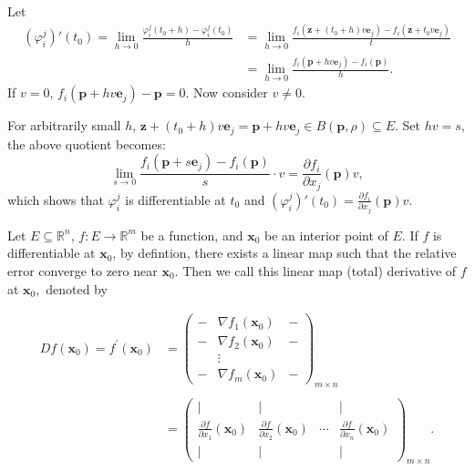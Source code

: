 \documentclass[12pt]{article}
\begin{document}
\begin{dbox}
\begin{pf}
Let 
\begin{align*}
(\varphi_i^j)'(t_0) = \lim_{h\to 0}\frac{\varphi_i^j(t_0+h)-\varphi_i^j(t_0)}{h}
&=\lim_{h\to 0}\frac{f_i(\mathbf{z} + (t_0+h) v \mathbf{e}_j)-f_i(\mathbf{z} + t_0 v \mathbf{e}_j)}{t}\\
&=\lim_{h\to 0}\frac{f_i(\mathbf{p}+hv\mathbf{e}_j)-f_i(\mathbf{p})}{h}.
\end{align*}
If $v=0$, $f_i(\mathbf{p}+hv\mathbf{e}_j)-\mathbf{p}=0.$
Now consider $v\ne 0$. 

For arbitrarily small $h$, $\mathbf{z} + (t_0 + h)v \mathbf{e}_j=\mathbf{p}+hv\mathbf{e}_j\in B(\mathbf{p},\rho)\subseteq E.$ 
Set $hv=s$, the above quotient becomes:
\[\lim_{s\to 0}\frac{f_i(\mathbf{p}+s\mathbf{e}_j)-f_i(\mathbf{p})}{s}\cdot v = \frac{\partial f_i}{\partial x_j}(\mathbf{p})v,\]
which shows that $\varphi_i^j$ is differentiable at $t_0$ and
$(\varphi_i^j)'(t_0) = \frac{\partial f_i}{\partial x_j}(\mathbf{p}) v.$
\end{pf}
\end{dbox}



\begin{remark}
Let $E \subseteq \mathbb{R}^n$, $f: E \to \mathbb{R}^m$ be a function, and $\mathbf{x}_0$ be an interior point of $E$.
If $f$ is differentiable at $\mathbf{x}_0$, by defintion, there exists a linear map such that the relative error converge to zero near $\mathbf{x}_0.$
Then we call this linear map (total) derivative of $f$ at $\mathbf{x}_0,$ denoted by

\begin{align*}
Df(\mathbf{x}_0) = f^\prime(\mathbf{x}_0) &=
\begin{pmatrix}
- & \nabla f_1(\mathbf{x}_0) & - \\
- & \nabla f_2(\mathbf{x}_0) & - \\
  & \vdots & \\
- & \nabla f_m(\mathbf{x}_0) & - 
\end{pmatrix}_{m \times n}\\ \\ &= 
\begin{pmatrix}
| & | & & | \\
\frac{\partial f}{\partial x_1}(\mathbf{x}_0) & \frac{\partial f}{\partial x_2}(\mathbf{x}_0) & \cdots & \frac{\partial f}{\partial x_n}(\mathbf{x}_0) \\
| & | & & |
\end{pmatrix}_{m \times n}.    
\end{align*}
\end{remark}
\end{document}
